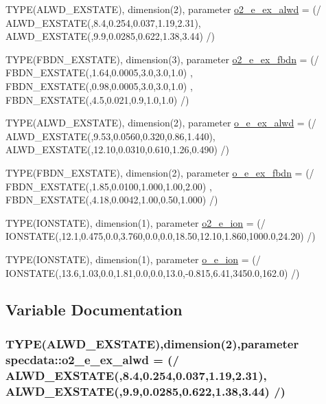 \begin{DoxyCompactItemize}
TYPE(ALWD\_\-EXSTATE), dimension(2), parameter \hyperlink{namespacespecdata_accca75874b57e169b91c0b680bffd51f}{o2\_\-e\_\-ex\_\-alwd} = (/ ALWD\_\-EXSTATE(,8.4,0.254,0.037,1.19,2.31), ALWD\_\-EXSTATE(,9.9,0.0285,0.622,1.38,3.44) /)
\item 
TYPE(FBDN\_\-EXSTATE), dimension(3), parameter \hyperlink{namespacespecdata_af2d6b8fc566715d79d76b79cc900229e}{o2\_\-e\_\-ex\_\-fbdn} = (/ FBDN\_\-EXSTATE(,1.64,0.0005,3.0,3.0,1.0) , FBDN\_\-EXSTATE(,0.98,0.0005,3.0,3.0,1.0) , FBDN\_\-EXSTATE(,4.5,0.021,0.9,1.0,1.0) /)
\item 
TYPE(ALWD\_\-EXSTATE), dimension(2), parameter \hyperlink{namespacespecdata_ac6de9abf8a4350031cdeed967f2b21b6}{o\_\-e\_\-ex\_\-alwd} = (/ ALWD\_\-EXSTATE(,9.53,0.0560,0.320,0.86,1.440), ALWD\_\-EXSTATE(,12.10,0.0310,0.610,1.26,0.490) /)
\item 
TYPE(FBDN\_\-EXSTATE), dimension(2), parameter \hyperlink{namespacespecdata_a31f902ca9efd2ca7817a66af34743c3d}{o\_\-e\_\-ex\_\-fbdn} = (/ FBDN\_\-EXSTATE(,1.85,0.0100,1.000,1.00,2.00) , FBDN\_\-EXSTATE(,4.18,0.0042,1.00,0.50,1.000) /)
\item 
TYPE(IONSTATE), dimension(1), parameter \hyperlink{namespacespecdata_a7040a4bcf92d1e17f6158536ca8d5b0a}{o2\_\-e\_\-ion} = (/ IONSTATE(,12.1,0.475,0.0,3.760,0.0,0.0,18.50,12.10,1.860,1000.0,24.20) /)
\item 
TYPE(IONSTATE), dimension(1), parameter \hyperlink{namespacespecdata_aa92d120444752fc22443b31d087da308}{o\_\-e\_\-ion} = (/ IONSTATE(,13.6,1.03,0.0,1.81,0.0,0.0,13.0,-\/0.815,6.41,3450.0,162.0) /)
\end{DoxyCompactItemize}


\subsection{Variable Documentation}
\hypertarget{namespacespecdata_accca75874b57e169b91c0b680bffd51f}{
\subsubsection[{o2\_\-e\_\-ex\_\-alwd}]{\setlength{\rightskip}{0pt plus 5cm}TYPE(ALWD\_\-EXSTATE),dimension(2),parameter {\bf specdata::o2\_\-e\_\-ex\_\-alwd} = (/ ALWD\_\-EXSTATE(,8.4,0.254,0.037,1.19,2.31), ALWD\_\-EXSTATE(,9.9,0.0285,0.622,1.38,3.44) /)}}
\label{namespacespecdata_accca75874b57e169b91c0b680bffd51f}


